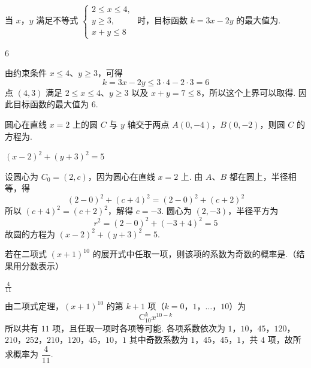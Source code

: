 \begin{problem}
当 \(x\)，\(y\) 满足不等式 \(\begin{cases}
2 \leqslant x \leqslant 4,\\
y \geqslant 3,\\
x + y \leqslant 8
\end{cases}\) 时，目标函数 \(k = 3x - 2y\) 的最大值为\fillinblank{}.
\end{problem}

\begin{answer}
\(6\)
\end{answer}

\begin{solution}
由约束条件 \(x\leqslant4\)、\(y\geqslant3\)，可得
\[
k=3x-2y\leqslant3\cdot4-2\cdot3=6
\]
点 \((4,3)\) 满足 \(2\leqslant x\leqslant4\)、\(y\geqslant3\) 以及 \(x+y=7\leqslant8\)，所以这个上界可以取得. 因此目标函数的最大值为 \(6\).
\end{solution}

\begin{problem}
圆心在直线 \(x = 2\) 上的圆 \(C\) 与 \(y\) 轴交于两点 \(A\left(0,-4\right)\)，\(B\left(0,-2\right)\)，则圆 \(C\) 的方程为\fillinblank{}.
\end{problem}

\begin{answer}
\(\left(x-2\right)^2+\left(y+3\right)^2=5\)
\end{answer}

\begin{solution}
设圆心为 \(C_0=(2,c)\)，因为圆心在直线 \(x=2\) 上. 由 \(A\)、\(B\) 都在圆上，半径相等，得
\[
(2-0)^2+(c+4)^2=(2-0)^2+(c+2)^2
\]
所以 \((c+4)^2=(c+2)^2\)，解得 \(c=-3\). 圆心为 \((2,-3)\)，半径平方为
\[
r^2=(2-0)^2+(-3+4)^2=5
\]
故圆的方程为 \(\left(x-2\right)^2+\left(y+3\right)^2=5\).
\end{solution}

\begin{problem}
若在二项式 \(\left(x + 1\right)^{10}\) 的展开式中任取一项，则该项的系数为奇数的概率是\fillinblank{}.（结果用分数表示）
\end{problem}

\begin{answer}
\(\frac{4}{11}\)
\end{answer}

\begin{solution}
由二项式定理，\((x+1)^{10}\) 的第 \(k+1\) 项（\(k=0\)，\(1\)，\(\ldots\)，\(10\)）为
\[
\mathrm C_{10}^{k}x^{10-k}
\]
所以共有 \(11\) 项，且任取一项时各项等可能. 各项系数依次为
\(1\)，\(10\)，\(45\)，\(120\)，\(210\)，\(252\)，\(210\)，\(120\)，\(45\)，\(10\)，\(1\)
其中奇数系数为 \(1\)，\(45\)，\(45\)，\(1\)，共 \(4\) 项，故所求概率为 \(\dfrac{4}{11}\).
\end{solution}

